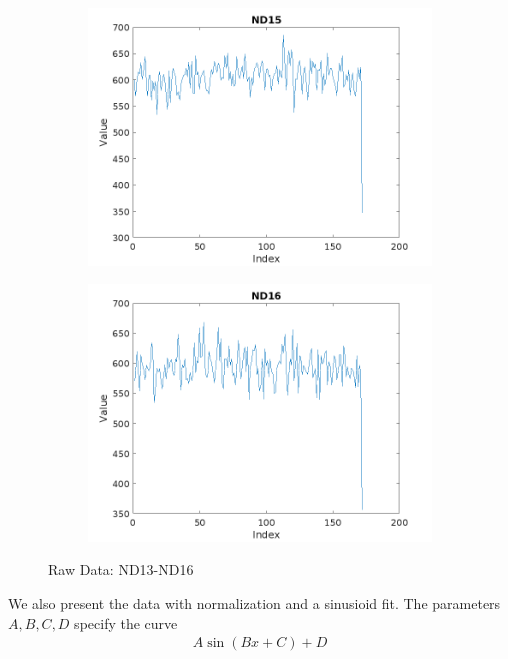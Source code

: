 \documentclass{article}
\numberwithin{equation}{section}
\begin{document}
\begin{figure}[h]
\begin{subfigure}[b]{0.45\textwidth}
        \includegraphics[width=\textwidth]{ND15.png}
    \end{subfigure}
    \hfill
    \begin{subfigure}[b]{0.45\textwidth}
        \includegraphics[width=\textwidth]{ND16.png}
    \end{subfigure}
    \caption{Raw Data: ND13-ND16}
    \label{fig:ND13-ND16}
\end{figure}


We also present the data with normalization and 
a sinusioid fit. The parameters $A, B, C, D$ specify the 
curve 
\begin{align}
    A\sin(Bx + C) + D
\end{align}
\end{document}
